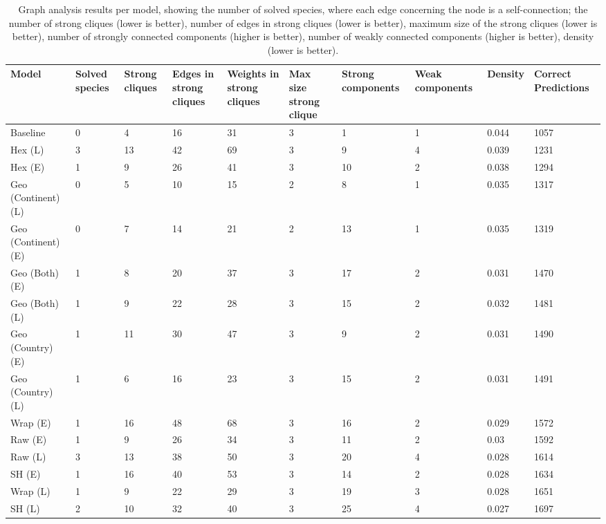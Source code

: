 \begin{table}[h!]
\centering
\caption{Graph analysis results per model, showing the number of solved species, where each edge concerning the node is a self-connection;
                   the number of strong cliques (lower is better), number of edges in strong cliques (lower is better), maximum size of the strong cliques (lower is better), number of strongly connected components (higher is better),
                   number of weakly connected components (higher is better), density (lower is better).}
\begin{tabular}{p{2cm}p{1.5cm}p{1.5cm}p{1.5cm}p{1.5cm}p{1.5cm}p{1.5cm}p{1.5cm}p{1.5cm}p{1.5cm}}
\hline
\textbf{Model} & \textbf{Solved species} & \textbf{Strong cliques} & \textbf{Edges in strong cliques} & \textbf{Weights in strong cliques} & \textbf{Max size strong clique} & \textbf{Strong components} & \textbf{Weak components} & \textbf{Density} & \textbf{Correct Predictions}\\
\hline
Baseline & 0 & 4 & 16 & 31 & 3 & 1 & 1 & 0.044 & 1057\\
Hex (L) & 3 & 13 & 42 & 69 & 3 & 9 & 4 & 0.039 & 1231\\
Hex (E) & 1 & 9 & 26 & 41 & 3 & 10 & 2 & 0.038 & 1294\\
Geo (Continent) (L) & 0 & 5 & 10 & 15 & 2 & 8 & 1 & 0.035 & 1317\\
Geo (Continent) (E) & 0 & 7 & 14 & 21 & 2 & 13 & 1 & 0.035 & 1319\\
Geo (Both) (E) & 1 & 8 & 20 & 37 & 3 & 17 & 2 & 0.031 & 1470\\
Geo (Both) (L) & 1 & 9 & 22 & 28 & 3 & 15 & 2 & 0.032 & 1481\\
Geo (Country) (E) & 1 & 11 & 30 & 47 & 3 & 9 & 2 & 0.031 & 1490\\
Geo (Country) (L) & 1 & 6 & 16 & 23 & 3 & 15 & 2 & 0.031 & 1491\\
Wrap (E) & 1 & 16 & 48 & 68 & 3 & 16 & 2 & 0.029 & 1572\\
Raw (E) & 1 & 9 & 26 & 34 & 3 & 11 & 2 & 0.03 & 1592\\
Raw (L) & 3 & 13 & 38 & 50 & 3 & 20 & 4 & 0.028 & 1614\\
SH (E) & 1 & 16 & 40 & 53 & 3 & 14 & 2 & 0.028 & 1634\\
Wrap (L) & 1 & 9 & 22 & 29 & 3 & 19 & 3 & 0.028 & 1651\\
SH (L) & 2 & 10 & 32 & 40 & 3 & 25 & 4 & 0.027 & 1697\\
\end{tabular}
\label{tab:graph_analysis}
\end{table}